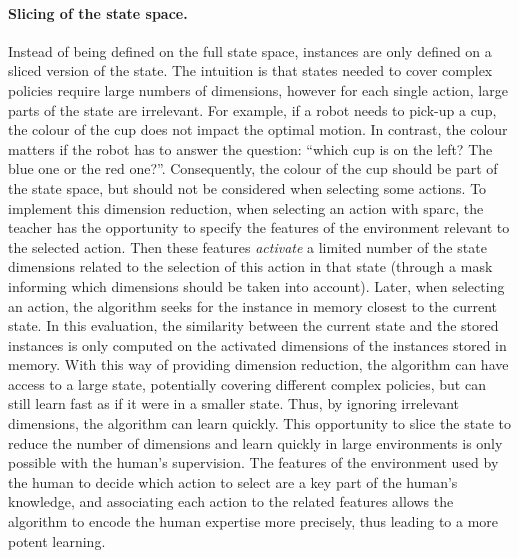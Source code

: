 \paragraph{Slicing of the state space.}
Instead of being defined on the full state space, instances are only defined on a sliced version of the state. The intuition is that states needed to cover complex policies require large numbers of dimensions, however for each single action, large parts of the state are irrelevant. For example, if a robot needs to pick-up a cup, the colour of the cup does not impact the optimal motion. In contrast, the colour matters if the robot has to answer the question: ``which cup is on the left? The blue one or the red one?''. Consequently, the colour of the cup should be part of the state space, but should not be considered when selecting some actions. To implement this dimension reduction, when selecting an action with \gls{sparc}, the teacher has the opportunity to specify the features of the environment relevant to the selected action. Then these features \textit{activate} a limited number of the state dimensions related to the selection of this action in that state (through a mask informing which dimensions should be taken into account). Later, when selecting an action, the algorithm seeks for the instance in memory closest to the current state. In this evaluation, the similarity between the current state and the stored instances is only computed on the activated dimensions of the instances stored in memory. With this way of providing dimension reduction, the algorithm can have access to a large state, potentially covering different complex policies, but can still learn fast as if it were in a smaller state. Thus, by ignoring irrelevant dimensions, the algorithm can learn quickly. This opportunity to slice the state to reduce the number of dimensions and learn quickly in large environments is only possible with the human's supervision. The features of the environment used by the human to decide which action to select are a key part of the human's knowledge, and associating each action to the related features allows the algorithm to encode the human expertise more precisely, thus leading to a more potent learning.

